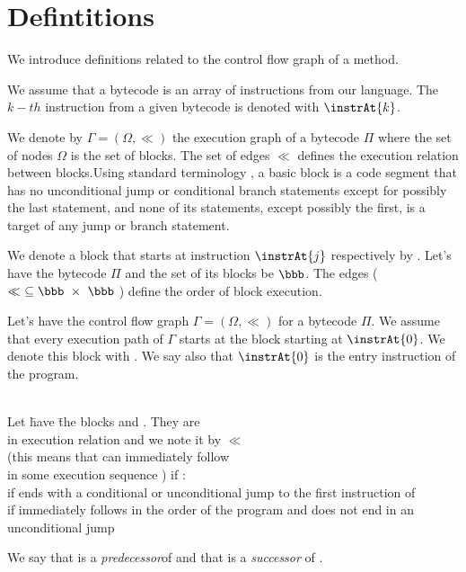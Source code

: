 \section{Defintitions}
We introduce definitions related to the control flow graph of a
method.

We assume that a bytecode is an array of instructions from our
language. The $k-th$ instruction from a given bytecode is denoted
with $\instrAt{k}$.

We denote by $\Gamma  = ( \Omega, \ll)$ the execution graph of a
bytecode $\Pi$ where the set of nodes $\Omega$ is the set of
blocks. The set of edges $\ll$ defines the execution relation
between blocks.Using standard terminology \cite{ARU1986com}, a
basic block is a code segment that has no unconditional jump or
conditional branch statements except for possibly the last
statement, and none of its statements, except possibly the first,
is a target of any jump or branch statement.

We denote a block that starts at instruction $\instrAt{j}$
respectively by . Let's have the bytecode $\Pi$ and the
set of its blocks  be $\bbb$. The edges ( $\ll \ \subseteq \bbb \ \times \ \bbb $ ) define the order of block execution.


\begin{defn}\label{entryBlock}
Let's have the control flow graph $\Gamma  = ( \Omega, \ll)$ for a bytecode $\Pi$. We assume that every execution path of $\Gamma$ starts at the block starting at
 $\instrAt{0}$. We denote this block with . We say
 also that $\instrAt{0}$ is the entry instruction of the program.
\end{defn}

\begin{defn}\label{execRel}
\begin{tabbing}
\\Let \=  have \= the blocks  and   . They
are\\
in execution relation  and we note it by  $\ll$ \\
(this means that  can immediately follow\\
\>  in some execution sequence  ) if : \\
\>  if   ends with a conditional or unconditional jump to the first instruction of \\
\>  if    immediately follows  in the order of the program and does not end in an\\
\> unconditional jump \\
\end{tabbing}
We say that   is a \textit{predecessor}of  and
that  is a \textit{successor} of .
\end{defn}


